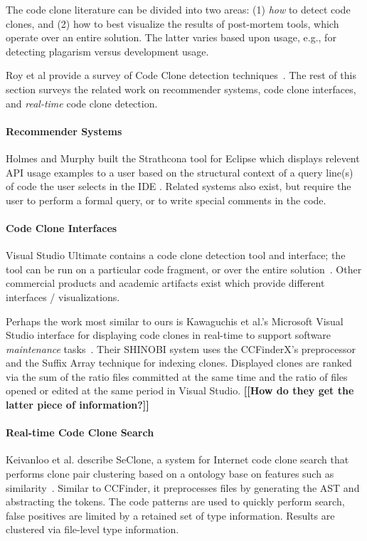 \documentclass[preprint,10pt]{sigplanconf}
\newcommand{\todo}[1]{{\bfseries [[#1]]}}
\begin{document}
The code clone literature can be divided into two areas: (1)
\emph{how} to detect code clones, and (2) how to best visualize the
results of post-mortem tools, which operate over an entire solution.
The latter varies based upon usage, e.g., for detecting plagarism
versus development usage.

Roy et al provide a survey of Code Clone detection
techniques~\cite{Roy2009}. The rest of this section surveys the
related work on recommender systems, code clone interfaces, and
\emph{real-time} code clone detection.

\paragraph{Recommender Systems}

Holmes and Murphy built the Strathcona tool for Eclipse which displays
relevent API usage examples to a user based on the structural context
of a query line(s) of code the user selects in the IDE
\cite{Holmes2005}. Related systems also exist, but require the user to
perform a formal query, or to write special comments in the code.

\paragraph{Code Clone Interfaces}

Visual Studio Ultimate contains a code clone detection tool and
interface; the tool can be run on a particular code fragment, or over
the entire solution~\cite{VSClones}. Other commercial products and
academic artifacts exist which provide different interfaces /
visualizations.

Perhaps the work most similar to ours is Kawaguchis et al.'s 
Microsoft Visual Studio interface for
displaying code clones in real-time to support software
\emph{maintenance} tasks~\cite{Kawaguchi2009,Yamashina2008}. Their
SHINOBI system uses the CCFinderX's preprocessor and the Suffix Array
technique for indexing clones. Displayed clones are ranked via the sum
of the ratio files committed at the same time and the ratio of files
opened or edited at the same period in Visual Studio. \todo{How do
  they get the latter piece of information?}

\paragraph{Real-time Code Clone Search}

Keivanloo et al. describe SeClone, a system for Internet code clone
search that performs clone pair clustering based on a ontology base on
features such as similarity~\cite{Keivanloo2011}. Similar to CCFinder,
it preprocesses files by generating the AST and abstracting the
tokens. The code patterns are used to quickly perform search, false
positives are limited by a retained set of type information. Results
are clustered via file-level type information.
\end{document}
